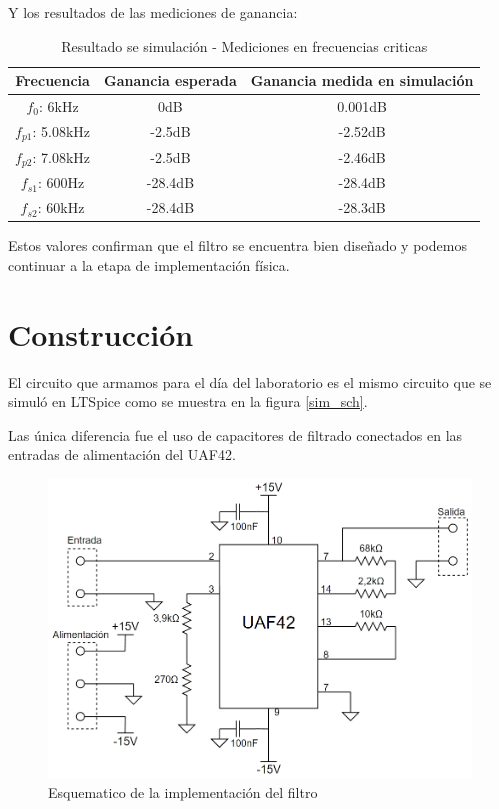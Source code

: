 \documentclass[11pt,a4paper]{report}
\begin{document}
Y los resultados de las mediciones de ganancia:

\begin{table}[H]
    \centering
    \begin{tabular}{c|c|c}
    Frecuencia & Ganancia esperada & Ganancia medida en simulación\\
    \hline
    $f_0$: 6kHz         & 0dB & 0.001dB \\
    \hline
    $f_{p1}$: 5.08kHz   & -2.5dB & -2.52dB \\
    \hline
    $f_{p2}$: 7.08kHz   & -2.5dB & -2.46dB \\
    \hline
    $f_{s1}$: 600Hz     & -28.4dB & -28.4dB \\
    \hline
    $f_{s2}$: 60kHz     & -28.4dB & -28.3dB \\
    \end{tabular}
    \caption{Resultado se simulación - Mediciones en frecuencias criticas}
    \label{tab:my_label}
\end{table}

Estos valores confirman que el filtro se encuentra bien diseñado y podemos continuar a la etapa de implementación física.

\chapter{Construcción}

El circuito que armamos para el día del laboratorio es el mismo circuito que se simuló en LTSpice como se muestra en la figura \ref{sim_sch}.

Las única diferencia fue el uso de capacitores de filtrado conectados en las entradas de alimentación del UAF42.

\begin{figure}[h]
\centering
\includegraphics[scale=0.5]{figs/pcb_sch.png}
\caption{Esquematico de la implementación del filtro}
\end{figure}
\end{document}
